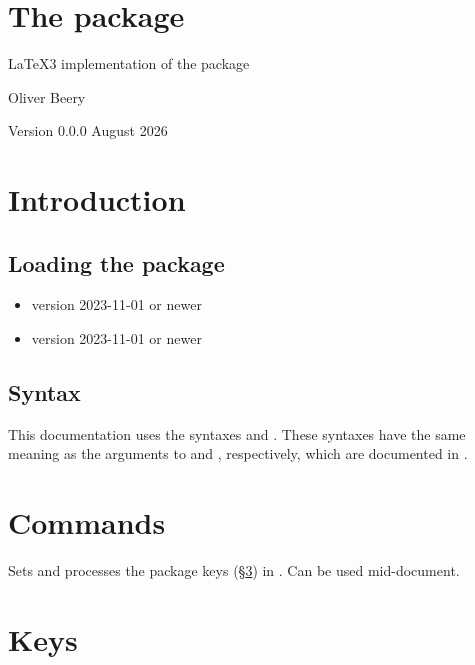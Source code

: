 \documentclass{beerydoc}
\begin{document}
\section*{\LARGE The  package}

\LaTeX3 implementation of the  package

Oliver Beery

Version 0.0.0 August 2026


\section{Introduction}

\subsection{Loading the package}
\label{subsec:load}

\begin{itemize}
  \item \LaTeXe{} version 2023-11-01 or newer
  \item {} version 2023-11-01 or newer
\end{itemize}

\subsection{Syntax}
\label{subsec:syntax}

This documentation uses the syntaxes  and .
These syntaxes have the same meaning as the arguments to  and
, respectively, which are documented in .


\section{Commands}
\label{sec:cmds}

\begin{code}{\xgeometrysetup}
  \begin{syntax}
     
  \end{syntax}
  Sets and processes the  package keys (\S\ref{sec:keys}) in
  .
  Can be used mid-document.
\end{code}

\section{Keys}
\label{sec:keys}
\end{document}
